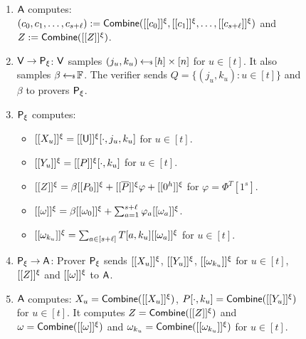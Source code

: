 \begin{figure}[h!]
\begin{framed}
\begin{itemize}
\begin{enumerate}[{\rm 1.}]
\item {\color{red} $\mathsf{A}$ computes: $(c_0,c_1,\ldots,c_{s+\ell}) :=
\mathsf{Combine}([[{c_0}]]^\xi,[[{c_1}]]^\xi,\ldots,[[{c_{s+\ell}}]]^\xi)$ and $Z :=
\mathsf{Combine}([[{Z}]]^\xi)$}.

\item $\mathsf{V}\rightarrow\mathsf{P}_\xi$: $\mathsf{V}$ samples $(j_u,k_u)\hskip2.3pt{\gets\!\!\mbox{\tiny${\$}$\normalsize}}\, [h]\times
[n]$ for $u\in [t]$. It also samples $\beta\hskip2.3pt{\gets\!\!\mbox{\tiny${\$}$\normalsize}}\,\mathbb{F}$. The verifier sends
$Q=\{(j_u,k_u):u\in [t]\}$ and $\beta$ to provers $\mathsf{P}_\xi$.
\item $\mathsf{P}_\xi$ computes:
	\begin{itemize}
	\item $[[{X_u}]]^\xi=[[{\mathsf{U}}]]^\xi[\cdot,j_u,k_u]$ for $u\in [t]$.
	\item $[[{Y_u}]]^\xi=[[{P}]]^\xi[\cdot,k_u]$ for $u\in [t]$.
	\item $[[{Z}]]^\xi=\beta[[{P_0}]]^\xi + [[{\overline{P}}]]^\xi\varphi + [[{0^h}]]^\xi$ for $\varphi=\Phi^T[1^s]$.
	\item $[[{\omega}]]^\xi=\beta[[{\omega_0}]]^\xi +
\sum_{a=1}^{s+\ell}\varphi_a[[{\omega_a}]]^\xi$.
	\item $[[{\omega_{k_u}}]]^\xi=\sum_{a\in [s+\ell]}T[a,k_u][[{\omega_a}]]^\xi$
for $u\in [t]$.
	\end{itemize}
\item $\mathsf{P}_\xi\rightarrow\mathsf{A}$: Prover $\mathsf{P}_\xi$ sends $[[{X_u}]]^\xi$,
$[[{Y_u}]]^\xi$, $[[{\omega_{k_u}}]]^\xi$ for $u\in [t]$, $[[{Z}]]^\xi$ and $[[{\omega}]]^\xi$ to $\mathsf{A}$.


\item {\color{red} $\mathsf{A}$ computes: $X_u=\mathsf{Combine}([[{X_u}]]^\xi)$,
$P[\cdot,k_u]=\mathsf{Combine}([[{Y_u}]]^\xi)$ for $u\in [t]$. It computes
$Z=\mathsf{Combine}([[{Z}]]^\xi)$ and $\omega=\mathsf{Combine}([[{\omega}]]^\xi)$ and 
$\omega_{k_u}=\mathsf{Combine}([[{\omega_{k_u}}]]^\xi)$ for $u\in [t]$}.
  

\end{enumerate}
\end{itemize}
\end{framed}
\end{figure}
